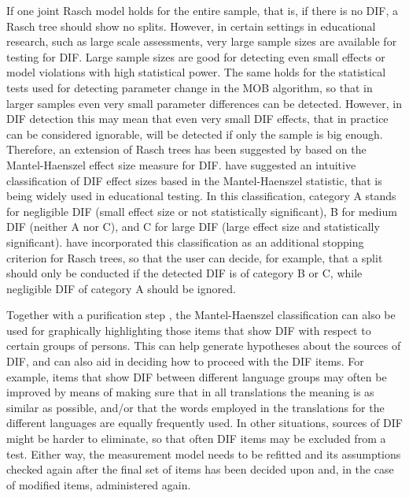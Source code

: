 \documentclass[doc,floatsintext,natbib]{apa7}
\begin{document}
If one joint Rasch model holds for the entire sample, that is, if there is no DIF, a Rasch tree should show no splits. However, in certain settings in educational research, such as large scale assessments, very large sample sizes are available for testing for DIF. Large sample sizes are good for detecting even small effects or model violations with high statistical power. The same holds for the statistical tests used for detecting parameter change in the MOB algorithm, so that in larger samples even very small parameter differences can be detected. However, in DIF detection this may mean that even very small DIF effects, that in practice can be considered ignorable, will be detected if only the sample is big enough. %
Therefore, an extension of Rasch trees has been suggested by \citet{HenDebStr:2023:EPM} based on the Mantel-Haenszel effect size measure for DIF. \citet{HolTha:1985} have suggested an intuitive classification of DIF effect sizes based in the Mantel-Haenszel statistic, that is being widely used in educational testing. In this classification, category A stands for negligible DIF (small effect size or not statistically significant), B for medium DIF (neither A nor C), and C for large DIF (large effect size and statistically significant). \citet{HenDebStr:2023:EPM} have incorporated this classification as an additional stopping criterion for Rasch trees, so that the user can decide, for example, that a split should only be conducted if the detected DIF is of category B or C, while negligible DIF of category A should be ignored. 

Together with a purification step \citep[see][%
]{HenDebStr:2023:EPM}, the Mantel-Haenszel classification can also be used for graphically highlighting those items that show DIF with respect to certain groups of persons. This can help generate hypotheses about the sources of DIF, and can also aid in deciding how to proceed with the DIF items. 
For example, items that show DIF between different language groups may often be improved by means of making sure that in all translations the meaning is as similar as possible, and/or that the words employed in the translations for the different languages are equally frequently used. In other situations, sources of DIF might be harder to eliminate, so that often DIF items may be excluded from a test. Either way, the measurement model needs to be refitted and its assumptions checked again after the final set of items has been decided upon and, in the case of modified items, administered again. 
\end{document}
